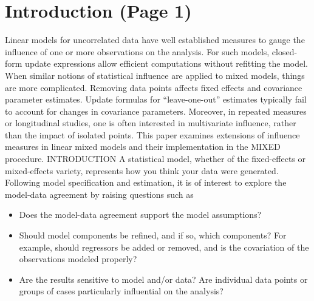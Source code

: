 \documentclass[Main.tex]{subfiles}
\begin{document}
\newpage

	
	\section{Introduction (Page 1)}
	
	Linear models for uncorrelated data have well established measures to gauge the influence of one or more
	observations on the analysis. For such models, closed-form update expressions allow efficient computations
	without refitting the model. When similar notions of statistical influence are applied to mixed models,
	things are more complicated. Removing data points affects fixed effects and covariance parameter estimates.
	Update formulas for “leave-one-out” estimates typically fail to account for changes in covariance
	parameters. Moreover, in repeated measures or longitudinal studies, one is often interested in multivariate
	influence, rather than the impact of isolated points. This paper examines extensions of influence measures
	in linear mixed models and their implementation in the MIXED procedure.
	INTRODUCTION
	A statistical model, whether of the fixed-effects or mixed-effects variety, represents how you think your data
	were generated. Following model specification and estimation, it is of interest to explore the model-data
	agreement by raising questions such as
	\begin{itemize}
		\item Does the model-data agreement support the model assumptions?
		\item Should model components be refined, and if so, which components? For example, should regressors
		be added or removed, and is the covariation of the observations modeled properly?
		\item Are the results sensitive to model and/or data? Are individual data points or groups of cases particularly
		influential on the analysis?
	\end{itemize}

	
\end{document}
